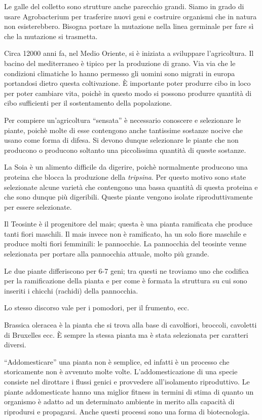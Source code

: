 \documentclass[]{article}
\begin{document}
Le galle del colletto sono strutture anche parecchio grandi. Siamo in
grado di usare Agrobacterium per trasferire nuovi geni e costruire
organismi che in natura non esisterebbero. Bisogna portare la mutazione
nella linea germinale per fare sì che la mutazione si trasmetta.

Circa 12000 anni fa, nel Medio Oriente, si è iniziata a sviluppare
l'agricoltura. Il bacino del mediterraneo è tipico per la produzione di
grano. Via via che le condizioni climatiche lo hanno permesso gli uomini
sono migrati in europa portandosi dietro questa coltivazione. È
importante poter produrre cibo in loco per poter cambiare vita, poichè
in questo modo si possono produrre quantità di cibo sufficienti per il
sostentamento della popolazione.

Per compiere un'agricoltura ``sensata'' è necessario conoscere e
selezionare le piante, poichè molte di esse contengono anche tantissime
sostanze nocive che usano come forma di difesa. Si devono dunque
selezionare le piante che non producono o producono soltanto una
piccolissima quantità di queste sostanze.

La Soia è un alimento difficile da digerire, poichè normalmente
producono una proteina che blocca la produzione della \emph{tripsina}.
Per questo motivo sono state selezionate alcune varietà che contengono
una bassa quantità di questa proteina e che sono dunque più digeribili.
Queste piante vengono isolate riproduttivamente per essere selezionate.

Il Teosinte è il progenitore del mais; questa è una pianta ramificata
che produce tanti fiori maschili. Il mais invece non è ramificato, ha un
solo fiore maschile e produce molti fiori femminili: le pannocchie. La
pannocchia del teosinte venne selezionata per portare alla pannocchia
attuale, molto più grande.

Le due piante differiscono per 6-7 geni; tra questi ne troviamo uno che
codifica per la ramificazione della pianta e per come è formata la
struttura su cui sono inseriti i chicchi (rachidi) della pannocchia.

Lo stesso discorso vale per i pomodori, per il frumento, ecc.

Brassica oleracea è la pianta che si trova alla base di cavolfiori,
broccoli, cavoletti di Bruxelles ecc. È sempre la stessa pianta ma è
stata selezionata per caratteri diversi.

``Addomesticare'' una pianta non è semplice, ed infatti è un processo
che storicamente non è avvenuto molte volte. L'addomesticazione di una
specie consiste nel dirottare i flussi genici e provvedere
all'isolamento riproduttivo. Le piante addomesticate hanno una miglior
fitness in termini di stima di quanto un organismo è adatto ad un
determinato ambiente in merito alla capacità di riprodursi e propagarsi.
Anche questi processi sono una forma di biotecnologia.
\end{document}
